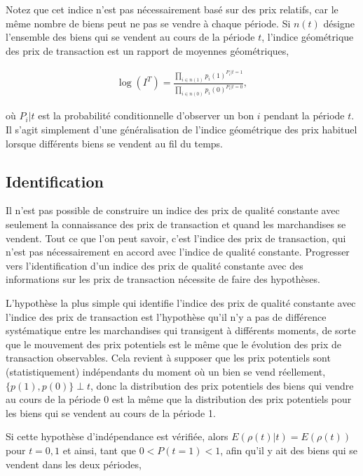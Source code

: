 \documentclass[
]{article}
\begin{document}
Notez que cet indice n'est pas nécessairement basé sur des prix relatifs, car le même nombre de biens peut ne pas se vendre à chaque période. Si \(n(t)\) désigne l'ensemble des biens qui se vendent au cours de la période \(t\), l'indice géométrique des prix de transaction est un rapport de moyennes géométriques,

\begin{align*}
\log (I^{T}) = \frac{\prod_{i \in n(1)} p_{i}(1)^{P_{i} | t = 1}}{\prod_{i \in n(0)} p_{i}(0)^{P_{i} | t = 0}},
\end{align*}

où \(P_{i} | t\) est la probabilité conditionnelle d'observer un bon \(i\) pendant la période \(t\). Il s'agit simplement d'une généralisation de l'indice géométrique des prix habituel lorsque différents biens se vendent au fil du temps.

\hypertarget{identification}{%
\subsection{Identification}\label{identification}}

Il n'est pas possible de construire un indice des prix de qualité constante avec seulement la connaissance des prix de transaction et quand les marchandises se vendent. Tout ce que l'on peut savoir, c'est l'indice des prix de transaction, qui n'est pas nécessairement en accord avec l'indice de qualité constante. Progresser vers l'identification d'un indice des prix de qualité constante avec des informations sur les prix de transaction nécessite de faire des hypothèses.

L'hypothèse la plus simple qui identifie l'indice des prix de qualité constante avec l'indice des prix de transaction est l'hypothèse qu'il n'y a pas de différence systématique entre les marchandises qui transigent à différents moments, de sorte que le mouvement des prix potentiels est le même que le évolution des prix de transaction observables. Cela revient à supposer que les prix potentiels sont (statistiquement) indépendants du moment où un bien se vend réellement, \(\{p(1), p(0)\} \perp t\), donc la distribution des prix potentiels des biens qui vendre au cours de la période 0 est la même que la distribution des prix potentiels pour les biens qui se vendent au cours de la période 1.

Si cette hypothèse d'indépendance est vérifiée, alors \(E(\rho(t) | t) = E(\rho(t))\) pour \(t = 0,1\) et ainsi, tant que \(0 <P (t = 1) <1\), afin qu'il y ait des biens qui se vendent dans les deux périodes,
\end{document}
